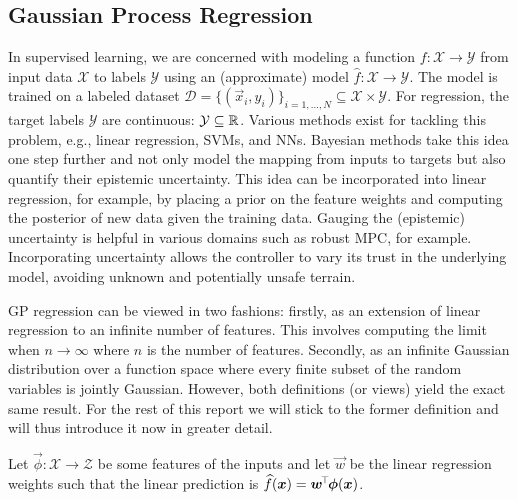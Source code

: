 \subsection{Gaussian Process Regression}
    In supervised learning, we are concerned with modeling a function $f : \mathcal{X} \to \mathcal{Y}$ from input data $\mathcal{X}$ to labels $\mathcal{Y}$ using an (approximate) model $\hat{f} : \mathcal{X} \to \mathcal{Y}$.
    The model is trained on a labeled dataset $\mathcal{D} = \{ (\vec{x}_i, y_i) \}_{i = 1, \dots, N} \subseteq \mathcal{X} \times \mathcal{Y}$.
    For regression, the target labels $\mathcal{Y}$ are continuous: $\mathcal{Y} \subseteq \mathbb{R}$.
    Various methods exist for tackling this problem, e.g., linear regression, \acp{SVM}, and \acp{NN}.
    Bayesian methods take this idea one step further and not only model the mapping from inputs to targets but also quantify their epistemic uncertainty.
    This idea can be incorporated into linear regression, for example, by placing a prior on the feature weights and computing the posterior of new data given the training data.
    Gauging the (epistemic) uncertainty is helpful in various domains such as robust \ac{MPC}, for example.
    Incorporating uncertainty allows the controller to vary its trust in the underlying model, avoiding unknown and potentially unsafe terrain.
    
    \ac{GP} regression can be viewed in two fashions:
    firstly, as an extension of linear regression to an infinite number of features.
    This involves computing the limit when $n \to \infty$ where $n$ is the number of features.
    Secondly, as an infinite Gaussian distribution over a function space where every finite subset of the random variables is jointly Gaussian.
    However, both definitions (or views) yield the exact same result.
    For the rest of this report we will stick to the former definition and will thus introduce it now in greater detail.
    
    Let $\vec{\phi} : \mathcal{X} \to \mathcal{Z}$ be some features of the inputs and let $\vec{w}$ be the linear regression weights such that the linear prediction is $\widehat{f}(\bm{x}) = \bm{w}^{\!\top\!} \bm{\phi}(\bm{x})$.

